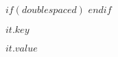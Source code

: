 \clearpage
{} %
$if(doublespaced)$
\renewcommand{\baselinestretch}{2}
$endif$
\small\normalsize
\hbox{\ }
 
\vspace{.5in}

\begin{center}
\large{$it.key$} 
\end{center} 

\vspace{1ex}

$it.value$
